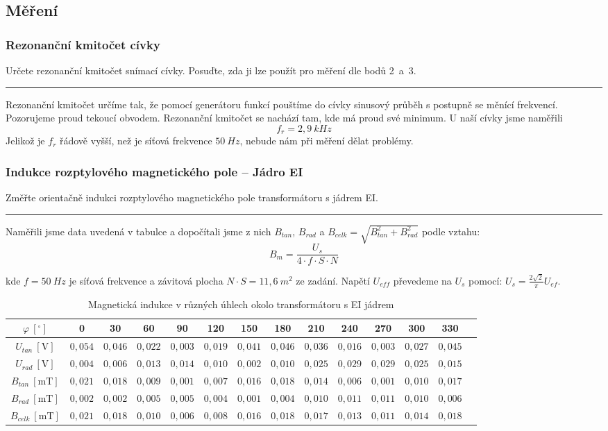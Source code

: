 \documentclass[a4paper,12pt]{article}
\begin{document}
\subsection{Měření}
\subsubsection{Rezonanční kmitočet cívky}
Určete rezonanční kmitočet snímací cívky. Posuďte, zda ji lze použít pro měření dle bodů 2~a~3.
\par\noindent\rule{\textwidth}{0.4pt}

Rezonanční kmitočet určíme tak, že pomocí generátoru funkcí pouštíme do cívky sinusový průběh s postupně se měnící frekvencí. Pozorujeme proud tekoucí obvodem. Rezonanční kmitočet se nachází tam, kde má proud své minimum. U naší cívky jsme naměřili
$$
f_r = 2,9\ kHz
$$
Jelikož je $f_r$ řádově vyšší, než je síťová frekvence $50\ Hz$, nebude nám při měření dělat problémy.

\subsubsection{Indukce rozptylového magnetického pole -- Jádro EI}
Změřte orientačně indukci rozptylového magnetického pole transformátoru s jádrem EI. 
\par\noindent\rule{\textwidth}{0.4pt}
Naměřili jsme data uvedená v tabulce a dopočítali jsme z nich $B_{tan}$, $B_{rad}$ a $B_{celk} = \sqrt{B_{tan}^2 + B_{rad}^2}$ podle vztahu:
$$
B_m = \frac{U_s}{4\cdot f \cdot S \cdot N}
$$

kde $f=50\ Hz$ je síťová frekvence a závitová plocha $N\cdot S = 11,6\ m^2$ ze zadání. Napětí $U_{eff}$ převedeme na $U_s$ pomocí: $U_s = \frac{2\sqrt{2}}{\pi} U_{ef}$.

\begin{table}[H]
\centering
\scriptsize
\begin{tabular}{|c|c|c|c|c|c|c|c|c|c|c|c|c|c|}
\hline
$\varphi\ [^\circ]$ 
& 0 & 30 & 60 & 90 & 120 & 150 & 180 & 210 & 240 & 270 & 300 & 330 \\
\hline
$U_{tan}\ [\mathrm{V}]$ 
& $0,054$ & $0,046$ & $0,022$ & $0,003$ & $0,019$ & $0,041$ & $0,046$ & $0,036$ & $0,016$ & $0,003$ & $0,027$ & $0,045$ \\
\hline
$U_{rad}\ [\mathrm{V}]$ 
& $0,004$ & $0,006$ & $0,013$ & $0,014$ & $0,010$ & $0,002$ & $0,010$ & $0,025$ & $0,029$ & $0,029$ & $0,025$ & $0,015$ \\
\hline
$B_{tan}\ [\mathrm{mT}]$ 
& $0,021$ & $0,018$ & $0,009$ & $0,001$ & $0,007$ & $0,016$ & $0,018$ & $0,014$ & $0,006$ & $0,001$ & $0,010$ & $0,017$ \\
\hline
$B_{rad}\ [\mathrm{mT}]$ 
& $0,002$ & $0,002$ & $0,005$ & $0,005$ & $0,004$ & $0,001$ & $0,004$ & $0,010$ & $0,011$ & $0,011$ & $0,010$ & $0,006$ \\
\hline
$B_{celk}\ [\mathrm{mT}]$ 
& $0,021$ & $0,018$ & $0,010$ & $0,006$ & $0,008$ & $0,016$ & $0,018$ & $0,017$ & $0,013$ & $0,011$ & $0,014$ & $0,018$ \\
\hline
\end{tabular}
\caption{Magnetická indukce v různých úhlech okolo transformátoru s EI jádrem}
\end{table}
\end{document}
